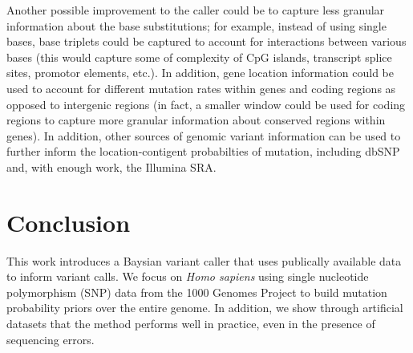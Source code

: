 \documentclass[10pt,letterpaper]{article}
\begin{document}
\par Another possible improvement to the caller could be to capture less granular information about the base substitutions; for example, instead of using single bases, base triplets could be captured to account
for interactions between various bases (this would capture some of complexity of CpG islands, transcript splice sites, promotor elements, etc.). In addition, gene location information could be used to account for
different mutation rates within genes and coding regions as opposed to intergenic regions (in fact, a smaller window could be used for coding regions to capture more granular information about conserved regions within genes).
In addition, other sources of genomic variant information can be used to further inform the location-contigent probabilties of mutation, including dbSNP and, with enough work, the Illumina SRA.

\section{Conclusion}
This work introduces a Baysian variant caller that uses publically
available data to inform variant calls. We focus on \textit{Homo sapiens} using single
nucleotide polymorphism (SNP) data from the 1000 Genomes Project to build mutation probability priors over the entire genome.
In addition, we show through artificial datasets that the method performs well in practice, even in the presence of sequencing errors.

{\small

{} %
}
\end{document}

